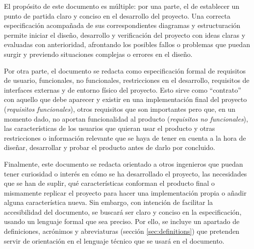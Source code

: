 El propósito de este documento es múltiple: por una parte, el de establecer
un punto de partida claro y conciso en el desarrollo del proyecto. Una correcta
especificación acompañada de sus correspondientes diagramas y estructuración
permite iniciar el diseño, desarrollo y verificación del proyecto con ideas
claras y evaluadas con anterioridad, afrontando los posibles fallos o problemas
que puedan surgir y previendo situaciones complejas o errores en el diseño.

Por otra parte, el documento se redacta como especificación formal de
requisitos de usuario, funcionales, no funcionales, restricciones en el
desarrollo, requisitos de interfaces externas y de entorno físico del proyecto.
Esto sirve como ``contrato'' con aquello que debe aparecer y existir en
una implementación final del proyecto (\textit{requisitos funcionales}),
otros requisitos que son importantes pero que, en un momento dado, no aportan
funcionalidad al producto (\textit{requisitos no funcionales}), las
características de los usuarios que quieran usar el producto y otras restricciones
o información relevante que se haya de tener en cuenta a la hora de diseñar, 
desarrollar y probar el producto antes de darlo por concluido.

Finalmente, este documento se redacta orientado a otros ingenieros que puedan
tener curiosidad o interés en cómo se ha desarrollado el proyecto, las necesidades
que se han de suplir, qué características conforman el producto final o mismamente
replicar el proyecto para hacer una implementación propia o añadir alguna 
característica nueva. Sin embargo, con intención de facilitar la accesibilidad del
documento, se buscará ser claro y conciso en la especificación, usando un
lenguaje formal que sea preciso. Por ello, se incluye un apartado de definiciones,
acrónimos y abreviaturas (sección \ref{sec:definitions}) que pretenden servir
de orientación en el lenguaje técnico que se usará en el documento.
